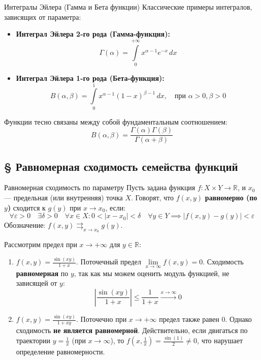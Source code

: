 \documentclass[12pt,a4paper]{article}
\begin{document}
\begin{Definition}{Интегралы Эйлера (Гамма и Бета функции)}{}
Классические примеры интегралов, зависящих от параметра:
\begin{itemize}
    \item \textbf{Интеграл Эйлера 2-го рода (Гамма-функция):} 
    $$ \Gamma(\alpha) = \int\limits_0^{+\infty} x^{\alpha - 1} e^{-x} \, dx $$
    \item \textbf{Интеграл Эйлера 1-го рода (Бета-функция):} 
    $$ B(\alpha, \beta) = \int\limits_0^1 x^{\alpha-1} (1-x)^{\beta-1} \, dx, \quad \text{при } \alpha > 0, \beta > 0 $$
\end{itemize}
Функции тесно связаны между собой фундаментальным соотношением:
$$ B(\alpha, \beta) = \frac{\Gamma(\alpha)\Gamma(\beta)}{\Gamma(\alpha+\beta)} $$
\end{Definition}


\subsection{§ Равномерная сходимость семейства функций}

\begin{Definition}{Равномерная сходимость по параметру}{}
Пусть задана функция $f: X \times Y \to \mathbb{R}$, и $x_0$ — предельная (или внутренняя) точка $X$.
Говорят, что $f(x, y)$ \textbf{равномерно (по $y$)} сходится к $g(y)$ при $x \to x_0$, если:
$$ \forall \varepsilon > 0 \quad \exists \delta > 0 \quad \forall x \in X: 0 < |x - x_0| < \delta \quad \forall y \in Y \implies |f(x,y) - g(y)| < \varepsilon $$
Обозначение: $f(x,y) \rightrightarrows_{x \to x_0} g(y)$.
\end{Definition}

\begin{Example}
Рассмотрим предел при $x \to +\infty$ для $y \in \mathbb{R}$:
\begin{enumerate}
    \item $f(x, y) = \frac{\sin(xy)}{1+x}$. Поточечный предел $\lim\limits_{x \to \infty} f(x, y) = 0$. Сходимость \textbf{равномерная} по $y$, так как мы можем оценить модуль функцией, не зависящей от $y$:
    $$ \left| \frac{\sin(xy)}{1+x} \right| \le \frac{1}{1+x} \xrightarrow{x \to \infty} 0 $$
    \item $f(x, y) = \frac{\sin(xy)}{1+xy}$. Поточечно при $x \to +\infty$ предел также равен $0$. Однако сходимость \textbf{не является равномерной}. 
    Действительно, если двигаться по траектории $y = \frac{1}{x}$ (при $x \to \infty$), то $f\left(x, \frac{1}{x}\right) = \frac{\sin(1)}{2} \ne 0$, что нарушает определение равномерности.
\end{enumerate}
\end{Example}
\end{document}
